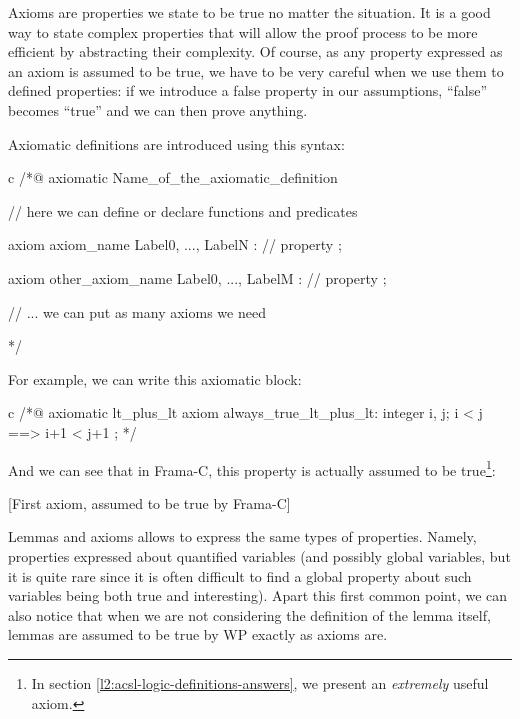 Axioms are properties we state to be true no matter the situation. It is
a good way to state complex properties that will allow the proof process
to be more efficient by abstracting their complexity. Of course, as any
property expressed as an axiom is assumed to be true, we have to be very
careful when we use them to defined properties: if we introduce a false
property in our assumptions, ``false'' becomes ``true'' and we can then
prove anything.





Axiomatic definitions are introduced using this syntax:



\begin{CodeBlock}{c}
/*@
  axiomatic Name_of_the_axiomatic_definition {
    // here we can define or declare functions and predicates

    axiom axiom_name { Label0, ..., LabelN }:
      // property ;

    axiom other_axiom_name { Label0, ..., LabelM }:
      // property ;

    // ... we can put as many axioms we need
  }
*/
\end{CodeBlock}



For example, we can write this axiomatic block:



\begin{CodeBlock}{c}
/*@
  axiomatic lt_plus_lt{
    axiom always_true_lt_plus_lt:
      \forall integer i, j; i < j ==> i+1 < j+1 ;
  }
*/
\end{CodeBlock}



And we can see that in Frama-C, this property is actually assumed to be
true\footnote{In section \ref{l2:acsl-logic-definitions-answers}, we
present an {\em extremely} useful axiom.}:



[First axiom, assumed to be true by Frama-C]







Lemmas and axioms allows to express the same types of properties.
Namely, properties expressed about quantified variables (and possibly
global variables, but it is quite rare since it is often difficult to
find a global property about such variables being both true and
interesting). Apart this first common point, we can also notice that
when we are not considering the definition of the lemma itself, lemmas
are assumed to be true by WP exactly as axioms are.




